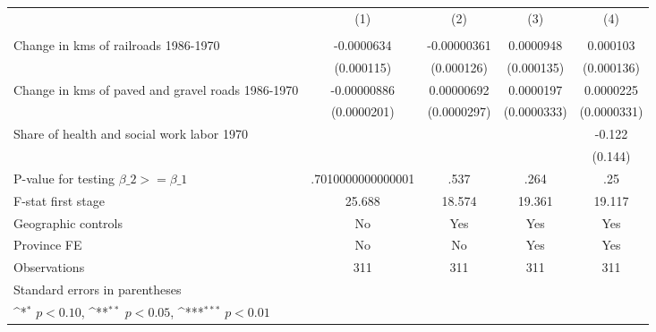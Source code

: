 {
\def\sym#1{\ifmmode^{#1}\else\(^{#1}\)\fi}
\begin{tabular}{l*{4}{c}}
\hline\hline
                &\multicolumn{1}{c}{(1)}&\multicolumn{1}{c}{(2)}&\multicolumn{1}{c}{(3)}&\multicolumn{1}{c}{(4)}\\
                &\multicolumn{1}{c}{}&\multicolumn{1}{c}{}&\multicolumn{1}{c}{}&\multicolumn{1}{c}{}\\
\hline
Change in kms of railroads 1986-1970&-0.0000634         &-0.00000361         &0.0000948         & 0.000103         \\
                &(0.000115)         &(0.000126)         &(0.000135)         &(0.000136)         \\
[1em]
Change in kms of paved and gravel roads 1986-1970&-0.00000886         &0.00000692         &0.0000197         &0.0000225         \\
                &(0.0000201)         &(0.0000297)         &(0.0000333)         &(0.0000331)         \\
[1em]
Share of health and social work labor 1970&                  &                  &                  &   -0.122         \\
                &                  &                  &                  &  (0.144)         \\
\hline
P-value for testing $\beta\_{2} >= \beta\_{1}$&.7010000000000001         &     .537         &     .264         &      .25         \\
F-stat first stage&   25.688         &   18.574         &   19.361         &   19.117         \\
Geographic controls&       No         &      Yes         &      Yes         &      Yes         \\
Province FE     &       No         &       No         &      Yes         &      Yes         \\
Observations    &      311         &      311         &      311         &      311         \\
\hline\hline
\multicolumn{5}{l}{\footnotesize Standard errors in parentheses}\\
\multicolumn{5}{l}{\footnotesize \sym{*} \(p<0.10\), \sym{**} \(p<0.05\), \sym{***} \(p<0.01\)}\\
\end{tabular}
}
